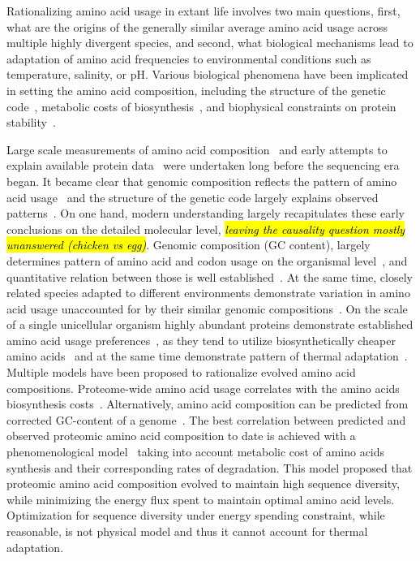 \documentclass[10pt,letterpaper]{article}
\begin{document}
Rationalizing amino acid usage in extant life involves two main questions, first, what are the origins of the generally similar average amino acid usage across multiple highly divergent species, and second, what biological mechanisms lead to adaptation of amino acid frequencies to environmental conditions such as temperature, salinity, or pH. Various biological phenomena have been implicated in setting the amino acid composition, including the structure of the genetic code~\cite{Jukes1975Amino,Knight2001Simple,Lightfield2011Across,Goncearenco2014Fundamental,King1969NonDarwinian}, metabolic costs of biosynthesis~\cite{Akashi2002Metabolic,Krick2014Amino,Seligmann2003CostMinimization,Swire2007Selection,Heizer2011Amino}, and biophysical constraints on protein stability~\cite{Berezovsky2007Positive}.


Large scale measurements of amino acid composition~\cite{Sueoka1961Correlation} and early attempts to explain available protein data~\cite{Jukes1975Amino,King1969NonDarwinian} were undertaken long before the sequencing era began. It became clear that genomic composition reflects the pattern of amino acid usage~\cite{Sueoka1961Correlation} and the structure of the genetic code largely explains observed patterns~\cite{Jukes1975Amino,King1969NonDarwinian}. On one hand, modern understanding largely recapitulates these early conclusions on the detailed molecular level, \hl{\it leaving the causality question mostly unanswered (chicken vs egg)}. Genomic composition (GC content), largely determines pattern of amino acid and codon usage on the organismal level~\cite{Kreil2001Identification,Knight2001Simple,Lightfield2011Across}, and quantitative relation between those is well established~\cite{Goncearenco2014Fundamental}. At the same time, closely related species adapted to different environments demonstrate variation in amino acid usage unaccounted for by their similar genomic compositions~\cite{Singer2003Thermophilic,Haney1999Thermal,Fukuchi2003Unique}. On the scale of a single unicellular organism highly abundant proteins demonstrate established amino acid usage preferences~\cite{Akashi2002Metabolic}, as they tend to utilize biosynthetically cheaper amino acids~\cite{Akashi2002Metabolic,Heizer2006Amino} and at the same time demonstrate pattern of thermal adaptation~\cite{Cherry2010Highly}. Multiple models have been proposed to rationalize evolved amino acid compositions. Proteome-wide amino acid usage correlates with the amino acids biosynthesis costs~\cite{Seligmann2003CostMinimization,Heizer2011Amino,Krick2014Amino}. Alternatively, amino acid composition can be predicted from corrected GC-content of a genome~\cite{Goncearenco2014Fundamental}. The best correlation between predicted and observed proteomic amino acid composition to date is achieved with a phenomenological model~\cite{Krick2014Amino} taking into account metabolic cost of amino acids synthesis and their corresponding rates of degradation. This model proposed that proteomic amino acid composition evolved to maintain high sequence diversity, while minimizing the energy flux spent to maintain optimal amino acid levels. Optimization for sequence diversity under energy spending constraint, while reasonable, is not physical model and thus it cannot account for thermal adaptation.
\end{document}
